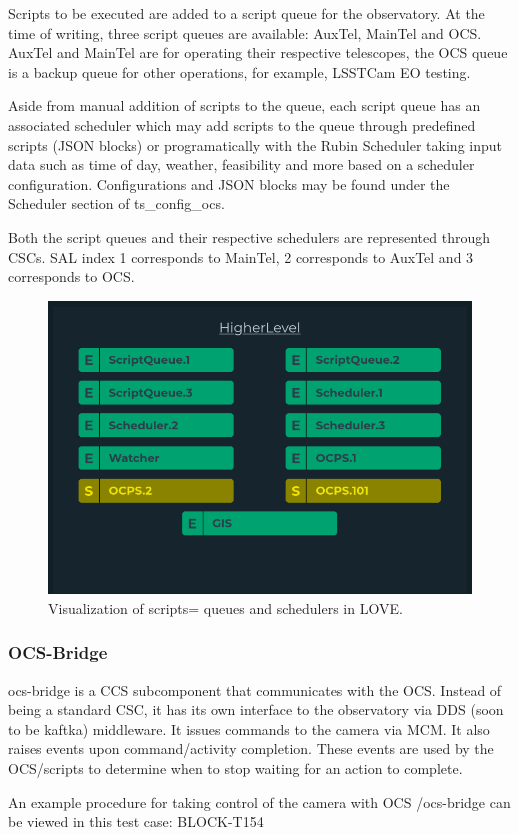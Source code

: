 Scripts to be executed are added to a script queue for the observatory. At the time of writing, three script queues are available: AuxTel, MainTel and OCS. AuxTel and MainTel are for operating their respective telescopes, the OCS queue is a backup queue for other operations, for example, LSSTCam EO testing.

Aside from manual addition of scripts to the queue, each script queue has an associated scheduler which may add scripts to the queue through predefined scripts (JSON blocks) or programatically with the Rubin Scheduler taking input data such as time of day, weather, feasibility and more based on a scheduler configuration. Configurations and JSON blocks may be found under the Scheduler section of ts\_config\_ocs.

Both the script queues and their respective schedulers are represented through CSCs. SAL index 1 corresponds to MainTel, 2 corresponds to AuxTel and 3 corresponds to OCS.

\begin{figure}
    \centering
    \includegraphics[width=0.6\linewidth]{figures/appendixFigs/schedulerscriptqueue.png}
    \caption{Visualization of scripts= queues and schedulers in LOVE.}
    \label{fig:app:schedulerscriptqueue.png}
\end{figure}

\subsubsection{OCS-Bridge}
ocs-bridge is a CCS subcomponent that communicates with the OCS. Instead of being a standard CSC, it has its own interface to the observatory via DDS (soon to be kaftka) middleware. It issues commands to the camera via MCM. It also raises events upon command/activity completion. These events are used by the OCS/scripts to determine when to stop waiting for an action to complete.

An example procedure for taking control of the camera with OCS /ocs-bridge can be viewed in this test case: BLOCK-T154


